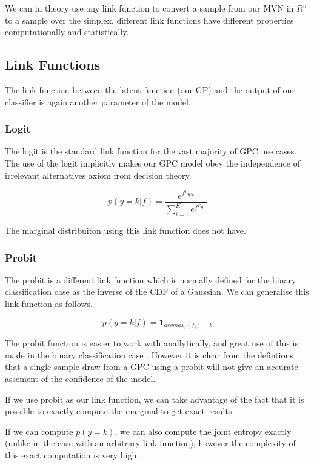 \documentclass[12pt, a4paper]{report}
\theoremstyle{definition}
\begin{document}
We can in theory use any link function to convert a sample from our MVN in $R^n$ to a sample over the simplex, different link functions have different properties computationally and statistically.

\subsection{Link Functions}

The link function between the latent function (our GP) and the output of our classifier is again another parameter of the model.

\subsubsection{Logit}

The logit is the standard link function for the vast majority of GPC use cases. The use of the logit implicitly makes our GPC model obey the independence of irrelevant alternatives axiom from decision theory. 


$$p\left( y = k | f\right) = \frac{e^{f^T w_k}}{\sum_{i=1}^{K} e^{f^T w_i}}$$


The marginal distribuiton using this link function does not have.


\subsubsection{Probit}

The probit is a different link function which is normally defined for the binary classification case as the inverse of the CDF of a Gaussian. We can generalise this link function as follows.

$$p\left(y = k | f\right) = \mathbf{1}_{argmax_i(f_i) = k}$$


The probit function is easier to work with anallytically, and great use of this is made in the binary classification case \cite{houlsby2011bayesian}. However it is clear from the defintions that a single sample draw from a GPC using a probit will not give an accurate assement of the confidence of the model.


\label{sec:Integration}

If we use probit as our link function, we can take advantage of the fact that it is possible to exactly compute the marginal to get exact results.

If we can compute $p(y=k)$, we can also compute the joint entropy exactly (unlike in the case with an arbitrary link function), however the complexity of this exact computation is very high.
\end{document}
